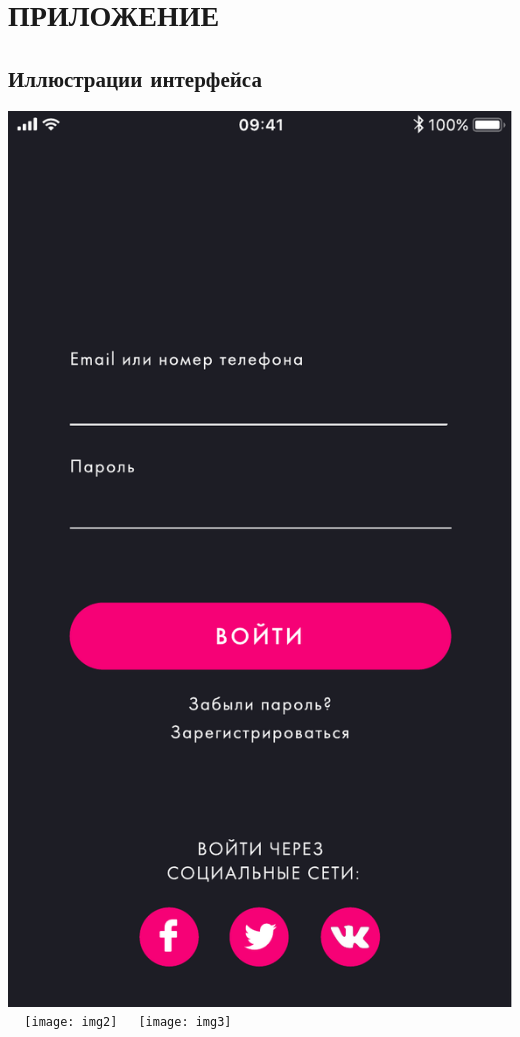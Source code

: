 \pagestyle{fancy}

\section{ПРИЛОЖЕНИЕ}

\subsection{Иллюстрации интерфейса}
\begin{center}
	
\includegraphics[scale=0.4]{img1}
$\;$$\;$$\;$
\texttt{[image: img2]}
$\;$$\;$$\;$
\texttt{[image: img3]}


\end{center}
